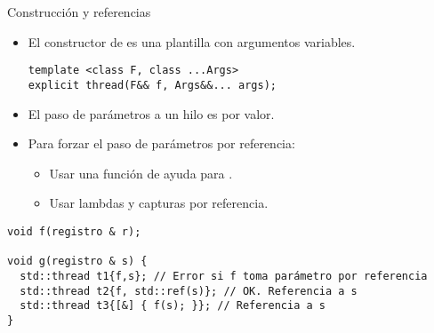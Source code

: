 \begin{frame}[fragile]{Construcción y referencias}
\begin{itemize}
  \item El constructor de  es una plantilla con argumentos variables.
\begin{lstlisting}
template <class F, class ...Args> 
explicit thread(F&& f, Args&&... args);
\end{lstlisting}
  \item El paso de parámetros a un hilo es por valor.
  \item Para forzar el paso de parámetros por referencia:
    \begin{itemize}
      \item Usar una función de ayuda para .
      \item Usar lambdas y capturas por referencia.
    \end{itemize}
\end{itemize}
\begin{block}{}
\begin{lstlisting}[basicstyle=\tiny]
void f(registro & r);

void g(registro & s) {
  std::thread t1{f,s}; // Error si f toma parámetro por referencia
  std::thread t2{f, std::ref(s)}; // OK. Referencia a s
  std::thread t3{[&] { f(s); }}; // Referencia a s
}
\end{lstlisting}
\end{block}
\end{frame}


